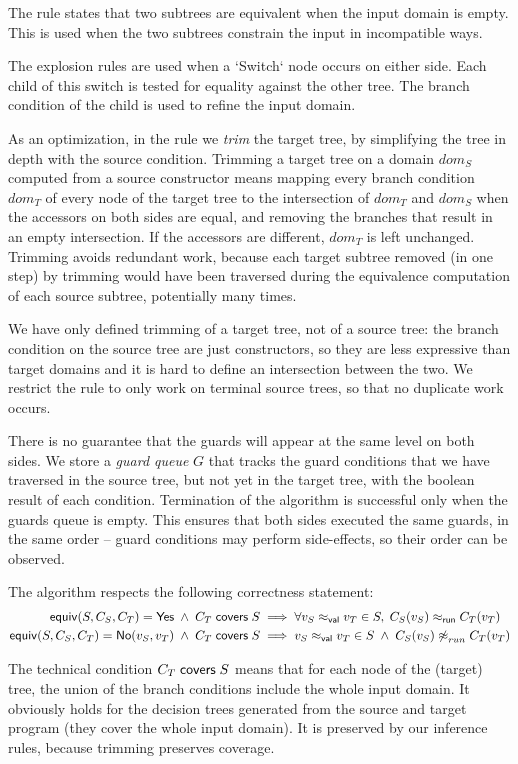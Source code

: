 \documentclass[12pt]{article}
\begin{document}
The  rule states that two subtrees are equivalent when the input domain is empty. This is used when the two subtrees constrain the input in incompatible ways.

The explosion rules are used when a `Switch` node occurs on either side. Each child of this switch is tested for equality against the other tree. The branch condition of the child is used to refine the input domain.

As an optimization, in the  rule we \emph{trim} the target tree, by simplifying the tree in depth with the source condition. Trimming
a target tree on a domain $dom_S$ computed from a source constructor means mapping every branch condition $dom_T$ of every node of the target tree to the intersection of $dom_T$ and $dom_S$ when the accessors on both sides are equal, and removing the branches that result in an empty intersection. If the accessors are different, \emph{$dom_T$} is left unchanged.
Trimming avoids redundant work, because each target subtree removed (in one step) by trimming would have been traversed during the equivalence computation of each source subtree, potentially many times.

We have only defined trimming of a target tree, not of a source tree: the branch condition on the source tree are just constructors, so they are less expressive than target domains and it is hard to define an intersection between the two. We restrict the  rule to only work on terminal source trees, so that no duplicate work occurs.

There is no guarantee that the guards will appear at the same level on both sides. We store a \emph{guard queue} $G$ that
tracks the guard conditions that we have traversed in the source tree, but not yet in the target tree, with the boolean result of each condition.
%
Termination of the algorithm is successful only when the guards queue is empty. This ensures that both sides executed the same guards, in the same order -- guard conditions may perform side-effects, so their order can be observed.

The algorithm respects the following correctness statement:
\begin{align*}
 \SimpleEquiv S {C_S} {C_T} = \Yes \;\land\; \covers {C_T} S
 & \implies
 \forall {\vrel {v_S} {v_T}} \in S,\; \runrel {C_S(v_S)} {C_T(v_T)}
\\
 \SimpleEquiv S {C_S} {C_T} = \No {v_S} {v_T} \;\land\; \covers {C_T} S
 & \implies
 \vrel {v_S} {v_T} \in S \;\land\; {\nparamrel{run} {C_S(v_S)} {C_T(v_T)}}
\end{align*}

The technical condition $\covers {C_T} S$ means that for each node of the (target) tree, the union of the branch conditions include the whole input domain. It obviously holds for the decision trees generated from the source and target program (they cover the whole input domain). It is preserved by our inference rules, because trimming preserves coverage.
\end{document}
